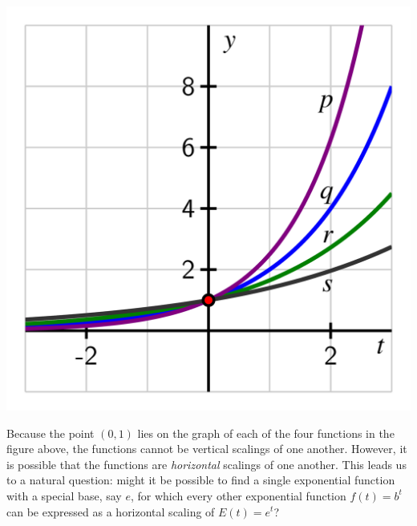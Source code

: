 \documentclass[nooutcomes]{ximera}
\begin{document}
\begin{image}
\includegraphics{e-base-compression.jpg}
\end{image}
Because the point $(0,1)$ lies on the graph of each of the four functions in the figure above, the functions cannot be vertical scalings of one another.  However, it is possible that the functions are \emph{horizontal} scalings of one another.  This leads us to a natural question:  might it be possible to find a single exponential function with a special base, say $e$, for which every other exponential function $f(t) = b^t$ can be expressed as a horizontal scaling of $E(t) = e^t$?
\end{document}
